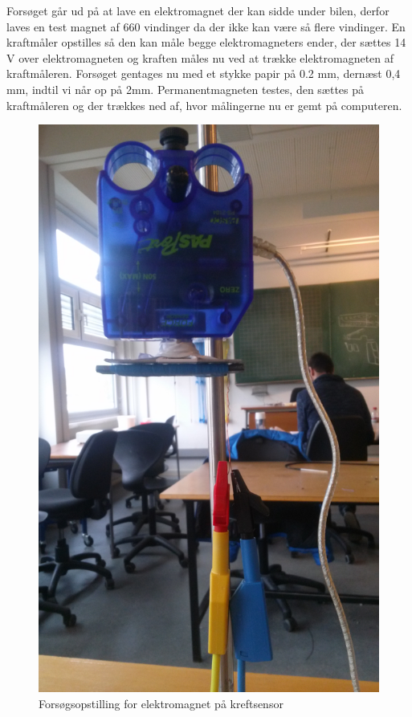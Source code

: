 Forsøget går ud på at lave en elektromagnet der kan sidde under bilen, derfor laves en test magnet af 660 vindinger da der ikke kan være så flere vindinger. En kraftmåler opstilles så den kan måle begge elektromagneters ender, der sættes 14 V over elektromagneten og kraften måles nu ved at trække elektromagneten af kraftmåleren. Forsøget gentages nu med et stykke papir på 0.2 mm, dernæst 0,4 mm, indtil vi når op på 2mm. Permanentmagneten testes, den sættes på kraftmåleren og der trækkes ned af, hvor målingerne nu er gemt på computeren.

\begin{figure}
\includegraphics[scale=0.05, angle=270]{./Graphics/Forsogs_opstilling}
\caption{Forsøgsopstilling for elektromagnet på kreftsensor}
\label{Opstilling}
\end{figure}

